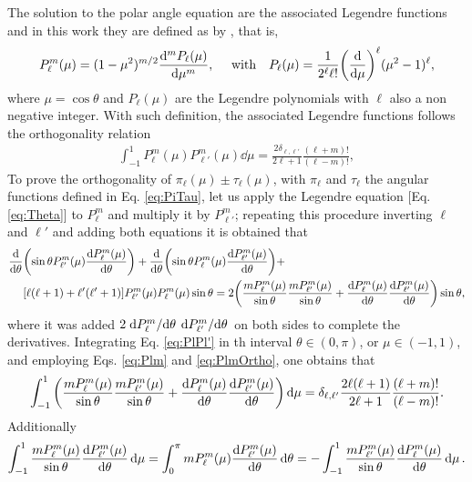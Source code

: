 The solution to the polar angle equation are the associated Legendre functions and in this work they are defined as by \citeauthor{arfken_mathematical_2001} \cite{arfken_mathematical_2001}, that is,
%
\begin{equation}
P_\ell^m(\mu) = (1-\mu^2)^{m/2}\dv[m]{P_\ell(\mu)}{\mu},
\qqtext{ with}
P_\ell(\mu) = \frac{1}{2^\ell \ell!}\qty(\dv{\mu})^\ell(\mu^2-1)^\ell,
\label{eq:Plm}
\end{equation}
%
where $\mu = \cos\theta$ and $P_\ell(\mu)$ are the Legendre polynomials with $\ell$ also a non negative integer. With such definition, the  associated Legendre functions follows the orthogonality relation
%
\begin{align}
\int_{-1}^1 P_\ell^m(\mu)P_{\ell'}^m(\mu)\dd{\mu} = \frac{2\delta_{\ell,\ell'}}{2\ell+1}\frac{(\ell+m)!}{(\ell-m)!},
\label{eq:PlmOrtho}
\end{align}
%
To prove the orthogonality of $\pi_\ell(\mu)\pm\tau_\ell(\mu)$, with $\pi_\ell$  and $\tau_\ell$ the angular functions defined in Eq. \eqref{eq:PiTau}, let us apply the Legendre equation [Eq. \eqref{eq:Theta}] to $P_\ell^m$ and multiply it by $P_{\ell'}^m$; repeating this procedure inverting $\ell$ and $\ell'$ and adding both equations it is obtained that
%
\begin{align}
\dv{\theta}&\qty(\sin\theta P_{\ell'}^m(\mu)\dv{P_\ell^m(\mu)}{\theta}) +
\dv{\theta}\qty(\sin\theta P_{\ell}^m(\mu)\dv{P_{\ell'}^m(\mu)}{\theta}) +  
\label{eq:PlPl'}
\\
&\qty[\ell(\ell+1)+\ell'(\ell'+1)]P_{\ell'}^m(\mu)P_{\ell}^m(\mu) \sin\theta
=
 2\qty(\frac{mP_\ell^m(\mu)}{\sin\theta}\frac{mP_{\ell'}^m(\mu)}{\sin\theta}+ \dv{P_\ell^m(\mu)}{\theta}\dv{P_{\ell'}^m(\mu)}{\theta})\sin\theta,\notag
\end{align}
%
where  it was added $2\dv*{P_\ell^m}{\theta}\dv*{P_{\ell'}^m}{\theta}$ on both sides to complete the derivatives. Integrating Eq. \eqref{eq:PlPl'} in th interval $\theta \in (0,\pi)$, or $\mu \in(-1,1)$, and employing Eqs. \eqref{eq:Plm} and \eqref{eq:PlmOrtho}, one obtains that
%
\begin{align}
\int_{-1}^1 \qty(\frac{mP_\ell^m(\mu)}{\sin\theta}\frac{mP_{\ell'}^m(\mu)}{\sin\theta}+ \dv{P_\ell^m(\mu)}{\theta}\dv{P_{\ell'}^m(\mu)}{\theta})\dd{\mu} = 
\delta_{\ell,\ell'}\frac{2\ell(\ell+1)}{2\ell+1}\frac{(\ell+m)!}{(\ell-m)!}.
\label{eq:PimlTauml}
\end{align}
%
Additionally 
%
\begin{align}
\int_{-1}^1\frac{mP_\ell^m(\mu)}{\sin\theta}\dv{P_{\ell'}^m(\mu)}{\theta}\dd{\mu}
 = \int_0^{\pi} mP_\ell^m(\mu)\dv{P_{\ell'}^m(\mu)}{\theta}\dd{\theta} = 
 -\int_{-1}^1\frac{mP_{\ell'}^m(\mu)}{\sin\theta}\dv{P_{\ell}^m(\mu)}{\theta}\dd{\mu}.
 \label{eq:taupiCross}
\end{align}
